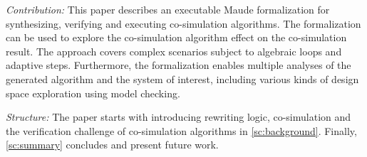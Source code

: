 \textit{Contribution:}
This paper describes an executable Maude formalization for synthesizing, verifying and executing co-simulation algorithms.
The formalization can be used to explore the co-simulation algorithm effect on the co-simulation result.
The approach covers complex scenarios subject to algebraic loops and adaptive steps.
Furthermore, the formalization enables multiple analyses of the generated algorithm and the system of interest, including various kinds of design space exploration using model checking. 

\textit{Structure:}
The paper starts with introducing rewriting logic, co-simulation and the verification challenge of co-simulation algorithms in \cref{sc:background}. 
Finally, \cref{sc:summary} concludes and present future work.